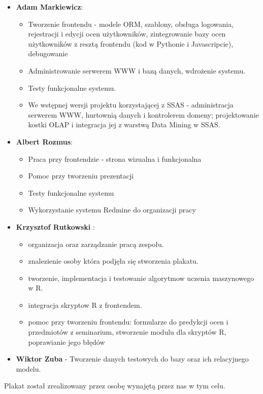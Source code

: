 \documentclass[licencjacka]{pracamgr}
\begin{document}
\begin{itemize}
\item \textbf{Adam Markiewicz}:
	\begin{itemize}
	        \item Tworzenie frontendu - modele ORM, szablony, obsługa logowania, rejestracji i edycji ocen użytkowników, zintegrowanie bazy ocen użytkowników z resztą frontendu (kod w Pythonie i Javascripcie), debugowanie
	        \item Administrowanie serwerem WWW i bazą danych, wdrożenie systemu.
	        \item Testy funkcjonalne systemu.
	        \item We wstępnej wersji projektu korzystającej z SSAS - administracja serwerem WWW, hurtownią danych i kontrolerem domeny; projektowanie kostki OLAP i integracja jej z warstwą Data Mining w SSAS.
	    \end{itemize}
\item \textbf{Albert Rozmus}:
  \begin{itemize}
        \item Praca przy frontendzie - strona wizualna i funkcjonalna
        \item Pomoc przy tworzeniu prezentacji
        \item Testy funkcjonalne systemu
        \item Wykorzystanie systemu Redmine do organizacji pracy
    \end{itemize}
\item \textbf{Krzysztof Rutkowski} :
    \begin{itemize}
        \item organizacja oraz zarządzanie pracą zespołu.
        \item znalezienie osoby która podjęła się stworzenia plakatu.
        \item tworzenie, implementacja i testowanie algorytmow uczenia maszynowego w R.
        \item integracja skryptow R z frontendem.
        \item pomoc przy tworzeniu frontendu: formularze do predykcji ocen i przedmiotów z seminarium, stworzenie modulu dla skryptów R, poprawianie jego błędów
    \end{itemize}
\item \textbf{Wiktor Zuba} - Tworzenie danych testowych do bazy oraz ich relacyjnego modelu. 
\end{itemize}

Plakat został zrealizowany przez osobę wynajętą przez nas w tym celu.
\end{document}
